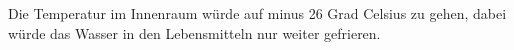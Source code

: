 Die Temperatur im Innenraum würde auf minus 26 Grad Celsius zu gehen, dabei würde das Wasser in den Lebensmitteln nur weiter gefrieren.